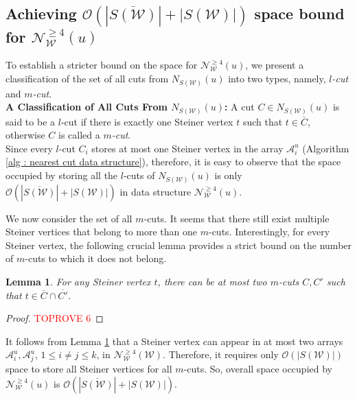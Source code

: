 \documentclass[letterpaper,11pt]{article}
\newtheorem{lemma}{Lemma}[]
\begin{document}
\subsection{Achieving ${\mathcal O}(|\overline{S({\mathcal W})}|+|S({\mathcal W})|)$ space bound for ${\mathcal N}_{\mathcal W}^{\ge 4}(u)$}
To establish a stricter bound on the space for ${\mathcal N}_{\mathcal W}^{\ge 4}(u)$, we present a classification of the set of all cuts from $N_{S({\mathcal W})}(u)$ into two types, namely, \textit{$l$-cut} and \textit{$m$-cut}. \\

\noindent
\textbf{A Classification of All Cuts From $N_{S({\mathcal W})}(u)$:} A cut $C\in N_{S({\mathcal W})}(u)$ is said to be a $l$-cut if there is exactly one Steiner vertex $t$ such that $t\in \overline{C}$, otherwise $C$ is called a \textit{$m$-cut}. \\

Since every $l$-cut $C_i$ stores at most one Steiner vertex in the array ${\mathcal A}_i^u$ (Algorithm \ref{alg : nearest cut data structure}), therefore, it is easy to observe that the space occupied by storing all the $l$-cuts of $N_{S({\mathcal W})}(u)$ is only ${\mathcal O}(|\overline{S({\mathcal W})}|+|S({\mathcal W})|)$ in data structure ${\mathcal N}_{\mathcal W}^{\ge 4}(u)$. 

We now consider the set of all $m$-cuts. It seems that there still exist multiple Steiner vertices that belong to more than one $m$-cuts. Interestingly, for every Steiner vertex, the following crucial lemma provides a strict bound on the number of $m$-cuts to which it does not belong.
\begin{lemma} \label{lem : a bunch belong to at most two cuts}
    For any Steiner vertex $t$, there can be at most two $m$-cuts $C,C'$ such that $t\in \overline{C}\cap \overline{C'}$. 
\end{lemma}
\begin{proof}\textcolor{red}{TOPROVE 6}\end{proof}



It follows from Lemma \ref{lem : a bunch belong to at most two cuts} that a Steiner vertex can appear in at most two arrays ${\mathcal A}_i^u, {\mathcal A}_j^u$, $1\le i\ne j \le k$, in ${\mathcal N}_{\mathcal W}^{\ge 4}({\mathcal W})$. Therefore, it requires only ${\mathcal O}(|S({\mathcal W})|)$ space to store all Steiner vertices for all $m$-cuts. So, overall space occupied by ${\mathcal N}_{\mathcal W}^{\ge 4}(u)$ is ${\mathcal O}(|\overline{S({\mathcal W})}|+|S({\mathcal W})|)$. \\
\end{document}
